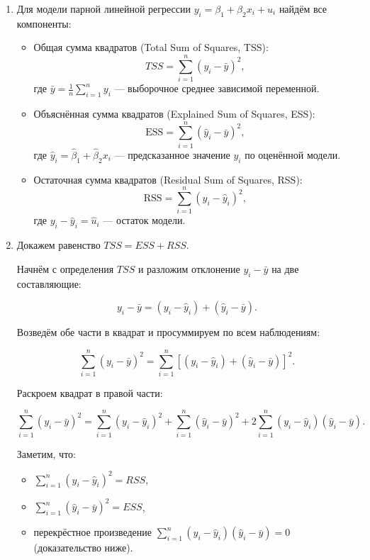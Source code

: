 \documentclass[12pt]{article}
\newcommand{\RSS}{RSS}
\newcommand{\ESS}{ESS}
\newcommand{\TSS}{TSS}
\begin{document}
\begin{sol}
\begin{enumerate}
    \item Для модели парной линейной регрессии \( y_i = \beta_1 + \beta_2 x_i + u_i \) найдём все компоненты:

\begin{itemize}
    \item Общая сумма квадратов (Total Sum of Squares, TSS):
    \[
    \TSS = \sum_{i=1}^n (y_i - \bar{y})^2,
    \]
    где \(\bar{y} = \frac{1}{n} \sum_{i=1}^n y_i\) — выборочное среднее зависимой переменной.

    \item Объяснённая сумма квадратов (Explained Sum of Squares, ESS):
    \[
    \text{ESS} = \sum_{i=1}^n (\hat{y}_i - \bar{y})^2,
    \]
    где \(\hat{y}_i = \hat{\beta}_1 + \hat{\beta}_2 x_i\) — предсказанное значение \(y_i\) по оценённой модели.

    \item Остаточная сумма квадратов (Residual Sum of Squares, RSS):
    \[
    \text{RSS} = \sum_{i=1}^n (y_i - \hat{y}_i)^2,
    \]
    где \(y_i - \hat{y}_i = \hat{u}_i\) — остаток модели.
\end{itemize}

\item Докажем равенство $\TSS = \ESS + \RSS$.

Начнём с определения $\TSS$ и разложим отклонение $y_i - \bar{y}$ на две составляющие:

\[
y_i - \bar{y} = (y_i - \hat{y}_i) + (\hat{y}_i - \bar{y}).
\]

Возведём обе части в квадрат и просуммируем по всем наблюдениям:

\[
\sum_{i=1}^n (y_i - \bar{y})^2 = \sum_{i=1}^n \left[ (y_i - \hat{y}_i) + (\hat{y}_i - \bar{y}) \right]^2.
\]

Раскроем квадрат в правой части:

\[
\sum_{i=1}^n (y_i - \bar{y})^2 = \sum_{i=1}^n (y_i - \hat{y}_i)^2 + \sum_{i=1}^n (\hat{y}_i - \bar{y})^2 + 2 \sum_{i=1}^n (y_i - \hat{y}_i)(\hat{y}_i - \bar{y}).
\]

Заметим, что:
\begin{itemize}
    \item \(\sum_{i=1}^n (y_i - \hat{y}_i)^2 = \RSS\),
    \item \(\sum_{i=1}^n (\hat{y}_i - \bar{y})^2 = \ESS\),
    \item перекрёстное произведение \(\sum_{i=1}^n (y_i - \hat{y}_i)(\hat{y}_i - \bar{y}) = 0\) (доказательство ниже).
\end{itemize}


\end{enumerate}
\end{sol}
\end{document}
